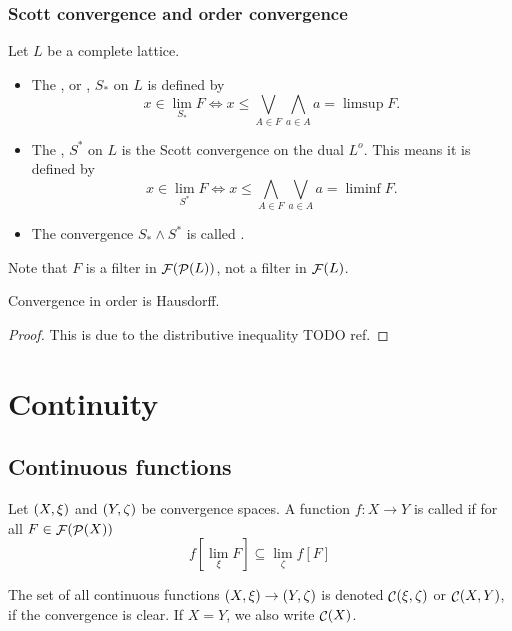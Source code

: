 \subsubsection{Scott convergence and order convergence}
\begin{definition}
Let $L$ be a complete lattice.
\begin{itemize}
\item The , or , $S_*$ on $L$ is defined by
\[ x \in \lim_{S_*} F \iff x \leq \bigvee_{A\in F}\bigwedge_{a\in A}a = \limsup F. \]

\item The , $S^*$ on $L$ is the Scott convergence on the dual $L^o$. This means it is defined by
\[ x \in \lim_{S^*} F \iff x \leq \bigwedge_{A\in F}\bigvee_{a\in A}a = \liminf F. \]
\item The convergence $S_* \wedge S^*$ is called .
\end{itemize}
\end{definition}
Note that $F$ is a filter in $\mathop{\mathcal{F}}(\mathop{\mathcal{P}}(L))$, not a filter in $\mathop{\mathcal{F}}(L)$.

\begin{proposition}
Convergence in order is Hausdorff.
\end{proposition}
\begin{proof}
This is due to the distributive inequality TODO ref.
\end{proof}

\section{Continuity}
\subsection{Continuous functions}
\begin{definition}
Let $\left( X,\xi \right)$ and $\left( Y,\zeta \right)$ be convergence spaces. A function $f: X\to Y$ is called  if for all $F \in \mathop{\mathcal{F}}(\mathop{\mathcal{P}}(X))$
\[ f\left[\lim_\xi F \right] \subseteq \lim_\zeta f[F] \]

The set of all continuous functions $\left( X,\xi \right) \to \left( Y,\zeta \right)$ is denoted $\mathop{\mathcal{C}}(\xi, \zeta)$ or $\mathop{\mathcal{C}}(X,Y)$, if the convergence is clear. If $X=Y$, we also write $\mathop{\mathcal{C}}(X)$.
\end{definition}

